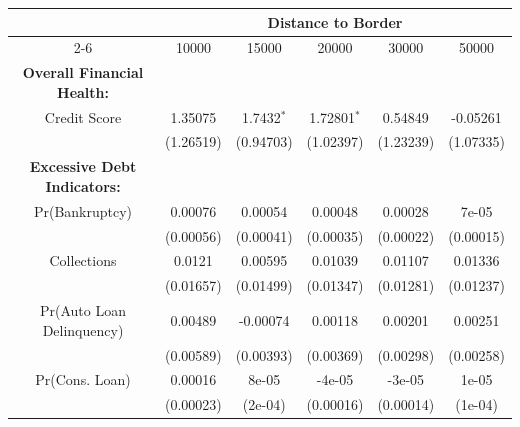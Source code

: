 \begin{tabular}{@{\extracolsep{5pt}} cccccc} 
\toprule
\midrule
& \multicolumn{5}{c}{Distance to Border} \\
\cmidrule(lr){2-6}
   & 10000 & 15000 & 20000 & 30000 & 50000 \\ 

\midrule
\textbf{Overall Financial Health:}  &  & & & & \\ 
  \enspace Credit Score & 1.35075 & 1.7432$^{*}$ & 1.72801$^{*}$ & 0.54849 & -0.05261 \\ 
  & (1.26519) & (0.94703) & (1.02397) & (1.23239) & (1.07335) \\ 

 \addlinespace
\textbf{Excessive Debt Indicators:}  &  & & & &  \\ 
  \enspace Pr(Bankruptcy) & 0.00076 & 0.00054 & 0.00048 & 0.00028 & 7e-05 \\ 
  & (0.00056) & (0.00041) & (0.00035) & (0.00022) & (0.00015) \\ 

   \addlinespace
\enspace Collections & 0.0121 & 0.00595 & 0.01039 & 0.01107 & 0.01336 \\ 
  & (0.01657) & (0.01499) & (0.01347) & (0.01281) & (0.01237) \\ 
 \addlinespace
\enspace Pr(Auto Loan Delinquency) & 0.00489 & -0.00074 & 0.00118 & 0.00201 & 0.00251 \\ 
  & (0.00589) & (0.00393) & (0.00369) & (0.00298) & (0.00258) \\ 
 \addlinespace
\enspace Pr(Cons. Loan) & 0.00016 & 8e-05 & -4e-05 & -3e-05 & 1e-05 \\ 
  & (0.00023) & (2e-04) & (0.00016) & (0.00014) & (1e-04) \\ 

  
\bottomrule 
\end{tabular} 
